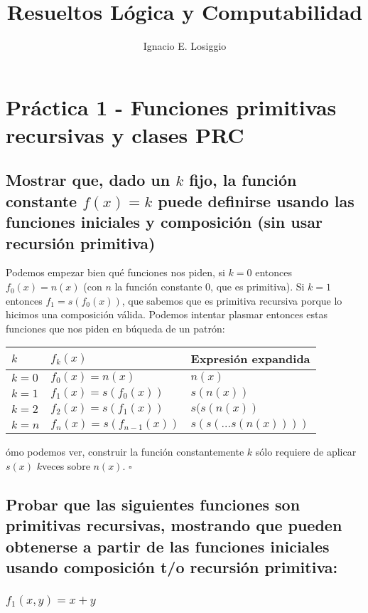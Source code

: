 \documentclass[11pt]{article} %
\title{Resueltos Lógica y Computabilidad}
\author{Ignacio E. Losiggio}
\newcommand{\desarrollo}[2]{

\hspace{2em}\parbox{\textwidth}{#1}

}
\begin{document}
\maketitle

\section{Práctica 1 - Funciones primitivas recursivas y clases PRC}

\subsection{Mostrar que, dado un $k$ fijo, la función constante $f(x)=k$ puede definirse usando las funciones iniciales y composición (sin usar recursión primitiva)}

Podemos empezar bien qué funciones nos piden, si $k = 0$  entonces $f_0(x)=n(x)$ (con $n$ la función constante $0$, que es primitiva).
Si $k = 1$ entonces $f_1 = s(f_0(x))$, que sabemos que es primitiva recursiva porque lo hicimos una composición válida.
Podemos intentar plasmar entonces estas funciones que nos piden en búqueda de un patrón: \\

\desarrollo{
\begin{tabular}{lll}
$k$     & $f_k(x)$                 & Expresión expandida \\ \hline
$k = 0$ & $f_0(x) = n(x)$          & $n(x)$ \\
$k = 1$ & $f_1(x) = s(f_0(x))$     & $s(n(x))$ \\
$k = 2$ & $f_2(x) = s(f_1(x))$     & $s(s(n(x))$ \\
$k = n$ & $f_n(x) = s(f_{n-1}(x))$ & $s(s(...s(n(x))))$ \\
\end{tabular}
}

Cómo podemos ver, construir la función constantemente $k$ sólo requiere de aplicar $s(x)$ $k$veces sobre $n(x)$. $\square$

\subsection{Probar que las siguientes funciones son primitivas recursivas, mostrando que pueden obtenerse a partir de las funciones iniciales usando composición t/o recursión primitiva:}

\subsubsection{$f_1(x,y)=x+y$}
\end{document}

